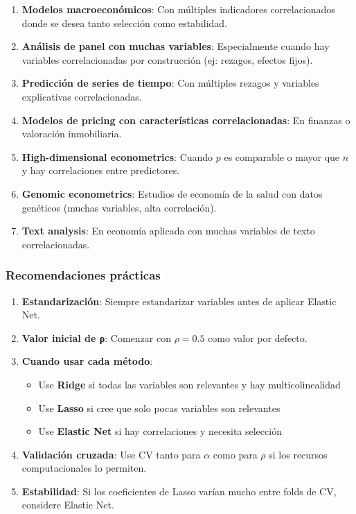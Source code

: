 \documentclass[
  doc,
  floatsintext,
  longtable,
  a4paper,
  nolmodern,
  notxfonts,
  notimes,
  12pt,
  colorlinks=true,linkcolor=blue,citecolor=blue,urlcolor=blue]{apa7}
\providecommand{\tightlist}{%
  \setlength{\itemsep}{0pt}\setlength{\parskip}{0pt}}
\begin{document}
\begin{enumerate}
\def\labelenumi{\arabic{enumi}.}
\item
  \textbf{Modelos macroeconómicos}: Con múltiples indicadores
  correlacionados donde se desea tanto selección como estabilidad.
\item
  \textbf{Análisis de panel con muchas variables}: Especialmente cuando
  hay variables correlacionadas por construcción (ej: rezagos, efectos
  fijos).
\item
  \textbf{Predicción de series de tiempo}: Con múltiples rezagos y
  variables explicativas correlacionadas.
\item
  \textbf{Modelos de pricing con características correlacionadas}: En
  finanzas o valoración inmobiliaria.
\item
  \textbf{High-dimensional econometrics}: Cuando \(p\) es comparable o
  mayor que \(n\) y hay correlaciones entre predictores.
\item
  \textbf{Genomic econometrics}: Estudios de economía de la salud con
  datos genéticos (muchas variables, alta correlación).
\item
  \textbf{Text analysis}: En economía aplicada con muchas variables de
  texto correlacionadas.
\end{enumerate}

\subsubsection{Recomendaciones
prácticas}\label{recomendaciones-pruxe1cticas}

\begin{enumerate}
\def\labelenumi{\arabic{enumi}.}
\item
  \textbf{Estandarización}: Siempre estandarizar variables antes de
  aplicar Elastic Net.
\item
  \textbf{Valor inicial de ρ}: Comenzar con \(\rho = 0.5\) como valor
  por defecto.
\item
  \textbf{Cuando usar cada método}:

  \begin{itemize}
  \tightlist
  \item
    Use \textbf{Ridge} si todas las variables son relevantes y hay
    multicolinealidad
  \item
    Use \textbf{Lasso} si cree que solo pocas variables son relevantes
  \item
    Use \textbf{Elastic Net} si hay correlaciones y necesita selección
  \end{itemize}
\item
  \textbf{Validación cruzada}: Use CV tanto para \(\alpha\) como para
  \(\rho\) si los recursos computacionales lo permiten.
\item
  \textbf{Estabilidad}: Si los coeficientes de Lasso varían mucho entre
  folds de CV, considere Elastic Net.
\end{enumerate}
\end{document}
